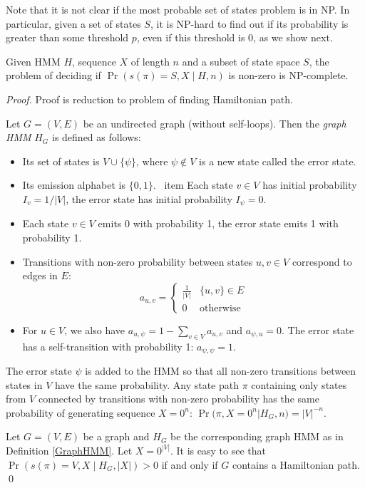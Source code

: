 
Note that it is not clear if the most probable set of states problem is in
NP. In particular, given a set of states $S$, it is NP-hard to find out if its
probability is greater than some threshold $p$, even if this threshold
is 0, as we show next.

\begin{theorem}
Given HMM $H$, sequence $X$ of length $n$ 
and a subset of state space $S$, the problem of deciding if
$\Pr\left(s(\pi)=S, X\mid H, n\right)$ is non-zero is NP-complete.
\end{theorem}

\begin{proof} Proof is reduction to problem of finding Hamiltonian path.

\begin{definition}\label{GraphHMM}
Let $G=(V,E)$ be an undirected graph (without self-loops). 
Then the \emph{graph HMM} $H_G$ is defined as follows:
\begin{itemize}[itemsep=-1mm]
\item Its set of states is $V\cup \{\psi\}$, where $\psi\notin V$ is a
   new state called the error state.
\item Its emission alphabet is $\{0,1\}$.
\ item Each state $v\in V$ has initial probability $I_{v} = 1/|V|$, the
error state has initial probability $I_{\psi}=0$.
\item Each state $v\in V$ emits 0 with probability 1, the error state emits 1 
with probability 1.
\item Transitions with non-zero probability between states $u,v\in V$
  correspond to edges in $E$:
$$a_{u,v}=\begin{cases}
\frac1{|V|} & \{u,v\}\in E\\
0 & \text{otherwise}
\end{cases}$$
\item For $u\in V$, we also have $a_{u,\psi}=1-\sum_{v\in V}a_{u,v}$
and $a_{\psi,u}=0$. The error state has a self-transition with 
probability 1: $a_{\psi,\psi}=1$.
\end{itemize}
\end{definition}

The error state $\psi$ is added to the HMM so that all non-zero
transitions between states in $V$ have the same probability. Any state
path $\pi$ containing only states from $V$ connected by transitions
with non-zero probability has the same probability of generating
sequence $X=0^n$: $\Pr(\pi, X=0^n|H_G,n) = |V|^{-n}$.

Let $G=(V,E)$ be a graph  
and $H_G$ be the corresponding graph HMM as
in Definition \ref{GraphHMM}. Let $X=0^{|V|}$.  
It is easy to see that $\Pr\left(s(\pi)=V,X \mid H_G, |X|
\right)>0$ if and only if $G$ contains a Hamiltonian path. \qed
\end{proof}

